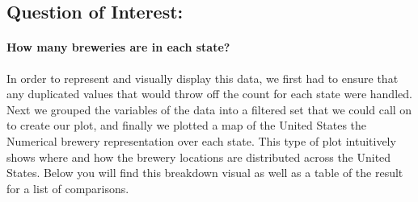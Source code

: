 \documentclass[
]{article}
\newenvironment{Shaded}{\begin{snugshade}}{\end{snugshade}}
\newcommand{\AttributeTok}[1]{\textcolor[rgb]{0.77,0.63,0.00}{#1}}
\newcommand{\CommentTok}[1]{\textcolor[rgb]{0.56,0.35,0.01}{\textit{#1}}}
\newcommand{\FunctionTok}[1]{\textcolor[rgb]{0.00,0.00,0.00}{#1}}
\newcommand{\NormalTok}[1]{#1}
\newcommand{\OtherTok}[1]{\textcolor[rgb]{0.56,0.35,0.01}{#1}}
\newcommand{\SpecialCharTok}[1]{\textcolor[rgb]{0.00,0.00,0.00}{#1}}
\newcommand{\StringTok}[1]{\textcolor[rgb]{0.31,0.60,0.02}{#1}}
\begin{document}
\begin{Shaded}
\end{Shaded}

\hypertarget{question-of-interest}{%
\subsection{Question of Interest:}\label{question-of-interest}}

\hypertarget{how-many-breweries-are-in-each-state}{%
\paragraph{How many breweries are in each
state?}\label{how-many-breweries-are-in-each-state}}

In order to represent and visually display this data, we first had to
ensure that any duplicated values that would throw off the count for
each state were handled. Next we grouped the variables of the data into
a filtered set that we could call on to create our plot, and finally we
plotted a map of the United States the Numerical brewery representation
over each state. This type of plot intuitively shows where and how the
brewery locations are distributed across the United States. Below you
will find this breakdown visual as well as a table of the result for a
list of comparisons.
\end{document}
